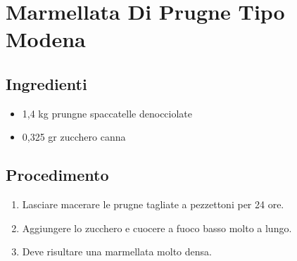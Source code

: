 \section{Marmellata Di Prugne Tipo Modena}
\subsection{Ingredienti}
\begin{itemize}
\item 1,4 kg prungne spaccatelle denocciolate  
\item 0,325 gr zucchero canna
\end{itemize}
\subsection{Procedimento}
\begin{enumerate}
\item  Lasciare macerare le prugne tagliate a pezzettoni per 24 ore.  
\item  Aggiungere lo zucchero e cuocere a fuoco basso molto a lungo.  
\item  Deve risultare una marmellata molto densa.
\end{enumerate}
